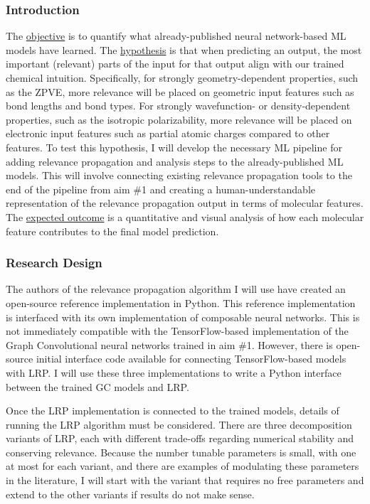 \documentclass[12pt]{article}
\begin{document}
\subsubsection{Introduction}
\label{sec:org0b37e03}

The \uline{objective} is to quantify what already-published neural network-based ML models have learned. The \uline{hypothesis} is that when predicting an output, the most important (relevant) parts of the input for that output align with our trained chemical intuition. Specifically, for strongly geometry-dependent properties, such as the ZPVE, more relevance will be placed on geometric input features such as bond lengths and bond types. For strongly wavefunction- or density-dependent properties, such as the isotropic polarizability, more relevance will be placed on electronic input features such as partial atomic charges compared to other features. To test this hypothesis, I will develop the necessary ML pipeline for adding relevance propagation and analysis steps to the already-published ML models. This will involve connecting existing relevance propagation tools \cite{JMLR:v17:15-618,github:lrp,github:lrp_tf,github:lrp_tf2} to the end of the pipeline from aim \#1 and creating a human-understandable representation of the relevance propagation output in terms of molecular features. The \uline{expected outcome} is a quantitative and visual analysis of how each molecular feature contributes to the final model prediction.

\subsubsection{Research Design}
\label{sec:org7c8d404}

The authors of the relevance propagation algorithm I will use have created an open-source reference implementation in Python. This reference implementation is interfaced with its own implementation of composable neural networks. This is not immediately compatible with the TensorFlow-based implementation of the Graph Convolutional neural networks trained in aim \#1. However, there is open-source initial interface code available for connecting TensorFlow-based models with LRP\cite{github:lrp_tf,github:lrp_tf2}. I will use these three implementations to write a Python interface between the trained GC models and LRP.

Once the LRP implementation is connected to the trained models, details of running the LRP algorithm must be considered. There are three decomposition variants of LRP, each with different trade-offs regarding numerical stability and conserving relevance\cite{Binder2016}. Because the number tunable parameters is small, with one at most for each variant, and there are examples of modulating these parameters in the literature, I will start with the variant that requires no free parameters and extend to the other variants if results do not make sense.
\end{document}
